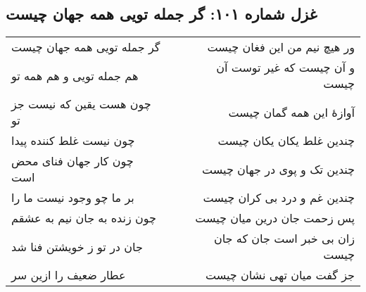 \begin{center}
\section*{غزل شماره ۱۰۱: گر جمله تویی همه جهان چیست}
\label{sec:101}
\begin{longtable}{l p{0.5cm} r}
گر جمله تویی همه جهان چیست
&&
ور هیچ نیم من این فغان چیست
\\
هم جمله تویی و هم همه تو
&&
و آن چیست که غیر توست آن چیست
\\
چون هست یقین که نیست جز تو
&&
آوازهٔ این همه گمان چیست
\\
چون نیست غلط کننده پیدا
&&
چندین غلط یکان یکان چیست
\\
چون کار جهان فنای محض است
&&
چندین تک و پوی در جهان چیست
\\
بر ما چو وجود نیست ما را
&&
چندین غم و درد بی کران چیست
\\
چون زنده به جان نیم به عشقم
&&
پس زحمت جان درین میان چیست
\\
جان در تو ز خویشتن فنا شد
&&
زان بی خبر است جان که جان چیست
\\
عطار ضعیف را ازین سر
&&
جز گفت میان تهی نشان چیست
\\
\end{longtable}
\end{center}
